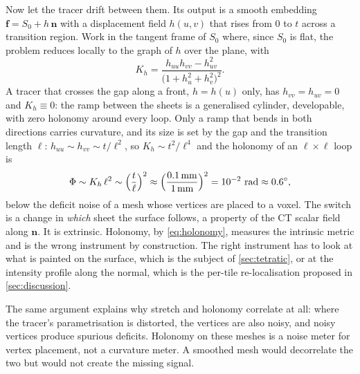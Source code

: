 Now let the tracer drift between them. Its output is a smooth embedding $\mathbf{f}=S_0+h\,\mathbf{n}$ with a displacement field $h(u,v)$ that rises from $0$ to $t$ across a transition region. Work in the tangent frame of $S_0$ where, since $S_0$ is flat, the problem reduces locally to the graph of $h$ over the plane, with
\begin{equation}
K_h=\frac{h_{uu}h_{vv}-h_{uv}^{2}}{\bigl(1+h_u^{2}+h_v^{2}\bigr)^{2}} .
\label{eq:graph}
\end{equation}
A tracer that crosses the gap along a front, $h=h(u)$ only, has $h_{vv}=h_{uv}=0$ and $K_h\equiv0$: the ramp between the sheets is a generalised cylinder, developable, with zero holonomy around every loop. Only a ramp that bends in both directions carries curvature, and its size is set by the gap and the transition length $\ell$: $h_{uu}\sim h_{vv}\sim t/\ell^{2}$, so $K_h\sim t^{2}/\ell^{4}$ and the holonomy of an $\ell\times\ell$ loop is
\begin{equation}
\Phi\sim K_h\,\ell^{2}\sim\Bigl(\frac{t}{\ell}\Bigr)^{2}\approx\Bigl(\frac{0.1\,\text{mm}}{1\,\text{mm}}\Bigr)^{2}=10^{-2}\ \text{rad}\approx0.6^{\circ},
\label{eq:estimate}
\end{equation}
below the deficit noise of a mesh whose vertices are placed to a voxel. The switch is a change in \emph{which} sheet the surface follows, a property of the CT scalar field along $\mathbf{n}$. It is extrinsic. Holonomy, by \cref{eq:holonomy}, measures the intrinsic metric and is the wrong instrument by construction. The right instrument has to look at what is painted on the surface, which is the subject of \cref{sec:tetratic}, or at the intensity profile along the normal, which is the per-tile re-localisation proposed in \cref{sec:discussion}.

\begin{remark}
The same argument explains why stretch and holonomy correlate at all: where the tracer's parametrisation is distorted, the vertices are also noisy, and noisy vertices produce spurious deficits. Holonomy on these meshes is a noise meter for vertex placement, not a curvature meter. A smoothed mesh would decorrelate the two but would not create the missing signal.
\end{remark}
